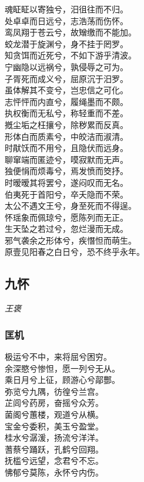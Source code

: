 \documentclass[]{article}
\begin{document}
魂眐眐以寄独兮，汨徂往而不归。\\
处卓卓而日远兮，志浩荡而伤怀。\\
鸾凤翔于苍云兮，故矰缴而不能加。\\
蛟龙潜于旋渊兮，身不挂于罔罗。\\
知贪饵而近死兮，不如下游乎清波。\\
宁幽隐以远祸兮，孰侵辱之可为。\\
子胥死而成义兮，屈原沉于汨罗。\\
虽体解其不变兮，岂忠信之可化。\\
志怦怦而内直兮，履绳墨而不颇。\\
执权衡而无私兮，称轻重而不差。\\
摡尘垢之枉攘兮，除秽累而反真。\\
形体白而质素兮，中皎洁而淑清。\\
时猒饫而不用兮，且隐伏而远身。\\
聊窜端而匿迹兮，嗼寂默而无声。\\
独便悁而烦毒兮，焉发愤而筊抒。\\
时暧暧其将罢兮，遂闷叹而无名。\\
伯夷死于首阳兮，卒夭隐而不荣。\\
太公不遇文王兮，身至死而不得逞。\\
怀瑶象而佩琼兮，愿陈列而无正。\\
生天坠之若过兮，忽烂漫而无成。\\
邪气袭余之形体兮，疾憯怛而萌生。\\
原壹见阳春之白日兮，恐不终乎永年。

\hypertarget{header-n3028}{%
\subsection{九怀}\label{header-n3028}}

\emph{王褒}

\hypertarget{header-n3033}{%
\subsubsection{匡机}\label{header-n3033}}

极运兮不中，来将屈兮困穷。\\
余深愍兮惨怛，愿一列兮无从。\\
乘日月兮上征，顾游心兮鄗酆。\\
弥览兮九隅，彷徨兮兰宫。\\
芷闾兮药房，奋摇兮众芳。\\
菌阁兮蕙楼，观道兮从横。\\
宝金兮委积，美玉兮盈堂。\\
桂水兮潺湲，扬流兮洋洋。\\
蓍蔡兮踊跃，孔鹤兮回翔。\\
抚槛兮远望，念君兮不忘。\\
怫郁兮莫陈，永怀兮内伤。
\end{document}
